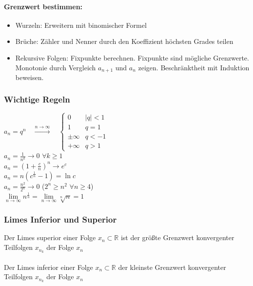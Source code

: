 \documentclass[6pt,a4paper]{scrartcl}
\newcommand{\ra}[0]{\ensuremath{\rightarrow}}
\begin{document}
\begin{multicols*}{4}
\paragraph{Grenzwert bestimmen:}
\begin{itemize}\itemsep0pt
\item Wurzeln: Erweitern mit binomischer Formel
\item Brüche: Zähler und Nenner durch den Koeffizient höchsten Grades teilen
\item Rekursive Folgen: Fixpunkte berechnen. Fixpunkte sind mögliche Grenzwerte. Monotonie durch Vergleich $a_{n+1}$ und $a_n$ zeigen. Beschränktheit mit Induktion beweisen.
\end{itemize}

\subsubsection{Wichtige Regeln}
$a_n=q^n \quad \overset{n \rightarrow \infty}{\longrightarrow} \quad \begin{cases} 0 & |q|<1 \\ 1 & q=1 \\ \pm \infty & q < -1  \\  + \infty & q > 1\end{cases}$ \\
$a_n=\frac{1}{n^k}\rightarrow 0$ \qquad $\forall k \ge 1$\\
$a_n=\left(1+\frac{c}{n}\right)^n \rightarrow e^c$ \\
$a_n=n\left(c^{\frac1{n}}-1\right) = \ln c$\\
$a_n=\frac{n^2}{2^n}\ra 0$ \qquad \qquad \qquad ($2^n \ge n^2$ \quad $\forall n\ge 4$) \\
$\lim\limits_{n\to\infty}n^{\frac{1}{n}}=\lim\limits_{n\to\infty}\sqrt[n]{n}=1$


\subsubsection{Limes Inferior und Superior}
Der Limes superior einer Folge $x_n \subset \mathbb{R}$ ist der größte Grenzwert konvergenter Teilfolgen $x_{n_k}$ der Folge ${x_n}$ \\ \\
Der Limes inferior einer Folge $x_n \subset \mathbb{R}$ der kleinste Grenzwert konvergenter Teilfolgen $x_{n_k}$ der Folge $x_n$



\end{multicols*}
\end{document}
